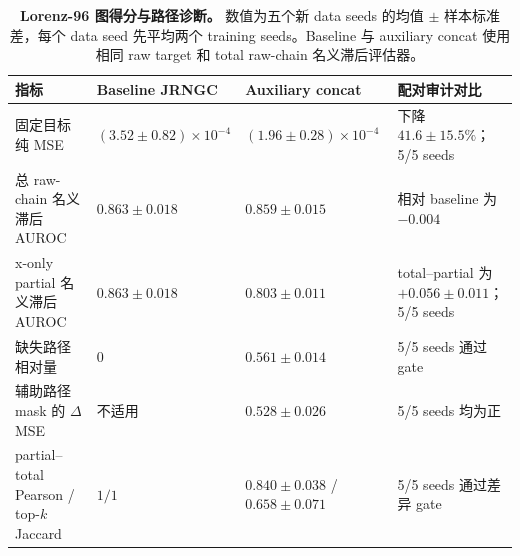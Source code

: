 \begin{table}[!t]
\centering
\caption{\textbf{Lorenz-96 图得分与路径诊断。} 数值为五个新 data seeds 的均值 $\pm$ 样本标准差，每个 data seed 先平均两个 training seeds。Baseline 与 auxiliary concat 使用相同 raw target 和 total raw-chain 名义滞后评估器。}
\label{tab:lorenz_confirmation}
\footnotesize
\begin{tabularx}{\textwidth}{p{}p{}p{}Y}
\toprule
指标 & Baseline JRNGC & Auxiliary concat & 配对审计对比 \\
\midrule
固定目标纯 MSE & $(3.52\pm0.82)\times10^{-4}$ & $(1.96\pm0.28)\times10^{-4}$ & 下降 $41.6\pm15.5\%$；5/5 seeds \\
总 raw-chain 名义滞后 AUROC & $0.863\pm0.018$ & $0.859\pm0.015$ & 相对 baseline 为 $-0.004$ \\
x-only partial 名义滞后 AUROC & $0.863\pm0.018$ & $0.803\pm0.011$ & total--partial 为 $+0.056\pm0.011$；5/5 seeds \\
缺失路径相对量 & $0$ & $0.561\pm0.014$ & 5/5 seeds 通过 gate \\
辅助路径 mask 的 $\Delta$MSE & 不适用 & $0.528\pm0.026$ & 5/5 seeds 均为正 \\
partial--total Pearson / top-$k$ Jaccard & $1/1$ & $0.840\pm0.038$ / $0.658\pm0.071$ & 5/5 seeds 通过差异 gate \\
\bottomrule
\end{tabularx}
\end{table}
